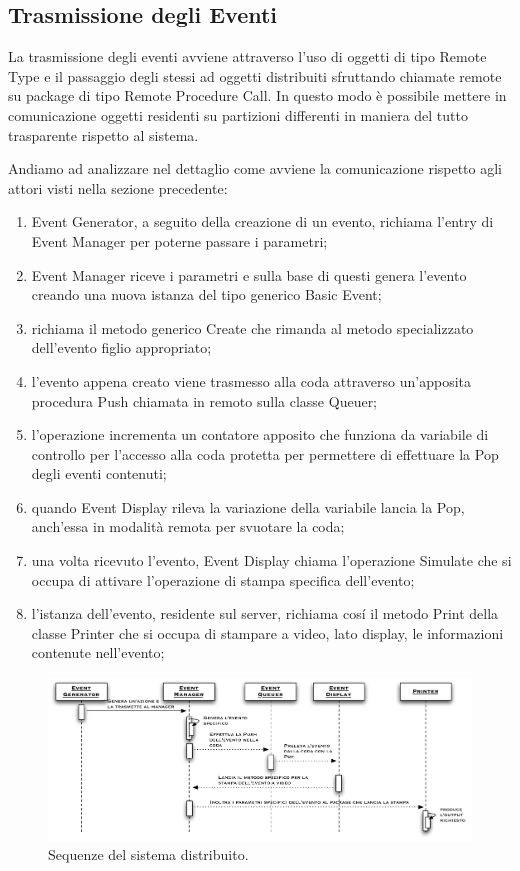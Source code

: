 \documentclass[aps,letterpaper,10pt]{article}
\begin{document}
\subsection{Trasmissione degli Eventi}

La trasmissione degli eventi avviene attraverso l'uso di oggetti di tipo Remote Type e il passaggio degli stessi ad oggetti distribuiti sfruttando chiamate remote su package di tipo Remote Procedure Call. In questo modo \`e possibile mettere in comunicazione oggetti residenti su partizioni differenti in maniera del tutto trasparente rispetto al sistema. \vspace{3mm}

Andiamo ad analizzare nel dettaglio come avviene la comunicazione rispetto agli attori visti nella sezione precedente:

\begin{enumerate}
	\item Event Generator, a seguito della creazione di un evento, richiama l'entry di Event Manager per poterne passare i parametri;
	\item Event Manager riceve i parametri e sulla base di questi genera l'evento creando una nuova istanza del tipo generico Basic Event;
	\item richiama il metodo generico Create che rimanda al metodo specializzato dell'evento figlio appropriato;
	\item l'evento appena creato viene trasmesso alla coda attraverso un'apposita procedura Push chiamata in remoto sulla classe Queuer;
	\item l'operazione incrementa un contatore apposito che funziona da variabile di controllo per l'accesso alla coda protetta per permettere di effettuare la Pop degli eventi contenuti;
	\item quando Event Display rileva la variazione della variabile lancia la Pop, anch'essa in modalit\`a remota per svuotare la coda;
	\item una volta ricevuto l'evento, Event Display chiama l'operazione Simulate che si occupa di attivare l'operazione di stampa specifica dell'evento;
	\item l'istanza dell'evento, residente sul server, richiama cos\'i il metodo Print della classe Printer che si occupa di stampare a video, lato display, le informazioni contenute nell'evento;
\end{enumerate}

\begin{figure}[H]
	\begin{center}
		\includegraphics[width=500px]{images/dist-sequence.pdf}
	\end{center}
\caption{Sequenze del sistema distribuito.}
\end{figure}
\end{document}
